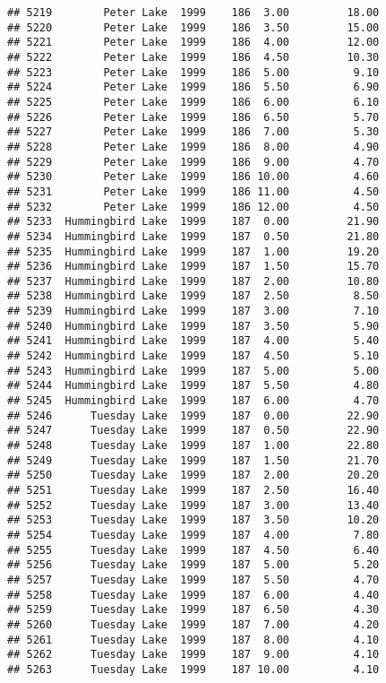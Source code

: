 \documentclass[
]{article}
\begin{document}
\begin{verbatim}
## 5219        Peter Lake  1999    186  3.00         18.00
## 5220        Peter Lake  1999    186  3.50         15.00
## 5221        Peter Lake  1999    186  4.00         12.00
## 5222        Peter Lake  1999    186  4.50         10.30
## 5223        Peter Lake  1999    186  5.00          9.10
## 5224        Peter Lake  1999    186  5.50          6.90
## 5225        Peter Lake  1999    186  6.00          6.10
## 5226        Peter Lake  1999    186  6.50          5.70
## 5227        Peter Lake  1999    186  7.00          5.30
## 5228        Peter Lake  1999    186  8.00          4.90
## 5229        Peter Lake  1999    186  9.00          4.70
## 5230        Peter Lake  1999    186 10.00          4.60
## 5231        Peter Lake  1999    186 11.00          4.50
## 5232        Peter Lake  1999    186 12.00          4.50
## 5233  Hummingbird Lake  1999    187  0.00         21.90
## 5234  Hummingbird Lake  1999    187  0.50         21.80
## 5235  Hummingbird Lake  1999    187  1.00         19.20
## 5236  Hummingbird Lake  1999    187  1.50         15.70
## 5237  Hummingbird Lake  1999    187  2.00         10.80
## 5238  Hummingbird Lake  1999    187  2.50          8.50
## 5239  Hummingbird Lake  1999    187  3.00          7.10
## 5240  Hummingbird Lake  1999    187  3.50          5.90
## 5241  Hummingbird Lake  1999    187  4.00          5.40
## 5242  Hummingbird Lake  1999    187  4.50          5.10
## 5243  Hummingbird Lake  1999    187  5.00          5.00
## 5244  Hummingbird Lake  1999    187  5.50          4.80
## 5245  Hummingbird Lake  1999    187  6.00          4.70
## 5246      Tuesday Lake  1999    187  0.00         22.90
## 5247      Tuesday Lake  1999    187  0.50         22.90
## 5248      Tuesday Lake  1999    187  1.00         22.80
## 5249      Tuesday Lake  1999    187  1.50         21.70
## 5250      Tuesday Lake  1999    187  2.00         20.20
## 5251      Tuesday Lake  1999    187  2.50         16.40
## 5252      Tuesday Lake  1999    187  3.00         13.40
## 5253      Tuesday Lake  1999    187  3.50         10.20
## 5254      Tuesday Lake  1999    187  4.00          7.80
## 5255      Tuesday Lake  1999    187  4.50          6.40
## 5256      Tuesday Lake  1999    187  5.00          5.20
## 5257      Tuesday Lake  1999    187  5.50          4.70
## 5258      Tuesday Lake  1999    187  6.00          4.40
## 5259      Tuesday Lake  1999    187  6.50          4.30
## 5260      Tuesday Lake  1999    187  7.00          4.20
## 5261      Tuesday Lake  1999    187  8.00          4.10
## 5262      Tuesday Lake  1999    187  9.00          4.10
## 5263      Tuesday Lake  1999    187 10.00          4.10

\end{verbatim}
\end{document}
